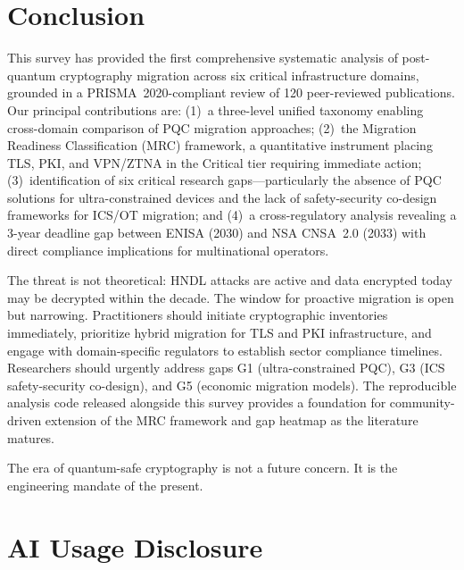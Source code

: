 \documentclass[journal]{IEEEtran}
\begin{document}
\section{Conclusion}
\label{sec:conclusion}

This survey has provided the first comprehensive systematic analysis of
post-quantum cryptography migration across six critical infrastructure domains,
grounded in a PRISMA~2020-compliant review of 120 peer-reviewed publications.
Our principal contributions are: (1)~a three-level unified taxonomy enabling
cross-domain comparison of PQC migration approaches; (2)~the Migration Readiness
Classification (MRC) framework, a quantitative instrument placing TLS, PKI,
and VPN/ZTNA in the Critical tier requiring immediate action; (3)~identification
of six critical research gaps---particularly the absence of PQC solutions for
ultra-constrained devices and the lack of safety-security co-design frameworks
for ICS/OT migration; and (4)~a cross-regulatory analysis revealing a 3-year
deadline gap between ENISA (2030) and NSA CNSA~2.0 (2033) with direct
compliance implications for multinational operators.

The threat is not theoretical: HNDL attacks are active and data encrypted today
may be decrypted within the decade. The window for proactive migration is open
but narrowing. Practitioners should initiate cryptographic inventories immediately,
prioritize hybrid migration for TLS and PKI infrastructure, and engage with
domain-specific regulators to establish sector compliance timelines. Researchers
should urgently address gaps G1 (ultra-constrained PQC), G3 (ICS safety-security
co-design), and G5 (economic migration models). The reproducible analysis code
released alongside this survey provides a foundation for community-driven
extension of the MRC framework and gap heatmap as the literature matures.

The era of quantum-safe cryptography is not a future concern. It is the
engineering mandate of the present.

\section*{AI Usage Disclosure}
\end{document}
